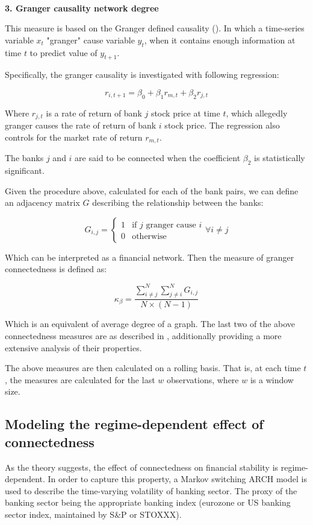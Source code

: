 \documentclass{article}
\begin{document}
\

\textbf{3. Granger causality network degree}

This measure is based on the Granger defined causality (\citet{granger}). In which a time-series variable $x_t$ "granger" cause variable $y_t$, when it contains enough information at time $t$ to predict value of $y_{t+1}$. 

Specifically, the granger causality is investigated with following regression:

\[r_{i,t+1} = \beta_0 + \beta_1 r_{m, t} + \beta_2 r_{j, t}\]

Where $r_{j, t}$ is a rate of return of bank $j$ stock price at time $t$, which allegedly granger causes the rate of return of bank $i$ stock price. The regression also controls for the market rate of return $r_{m, t}$.

The banks $j$ and $i$ are said to be connected when the coefficient $\beta_2$ is statistically significant. 

Given the procedure above, calculated for each of the bank pairs, we can define an adjacency matrix $G$ describing the relationship between the banks:

\[G_{i,j} = \begin{cases}
    1  & \text{if } j \text{ granger cause } i \\
    0 & \text{otherwise}
  \end{cases} \forall i \neq j\]

Which can be interpreted as a financial network. Then the measure of granger connectedness is defined as:

\[\kappa_{\beta} = \frac{\sum_{i \neq j}^{N} \sum_{j \neq i}^{N} G_{i,j}}{ N \times (N-1)}\]

Which is an equivalent of average degree of a graph. The last two of the above connectedness measures are as described in \citet{billio}, additionally providing a more extensive analysis of their properties.

The above measures are then calculated on a rolling basis. That is, at each time $t$, the measures are calculated for the last $w$ observations, where $w$ is a window size. 

\subsection*{Modeling the regime-dependent effect of connectedness}

As the theory suggests, the effect of connectedness on financial stability is regime-dependent. In order to capture this property, a Markov switching ARCH model is used to describe the time-varying volatility of banking sector. The proxy of the banking sector being the appropriate banking index (eurozone or US banking sector index, maintained by S\&P or STOXXX).
\end{document}

